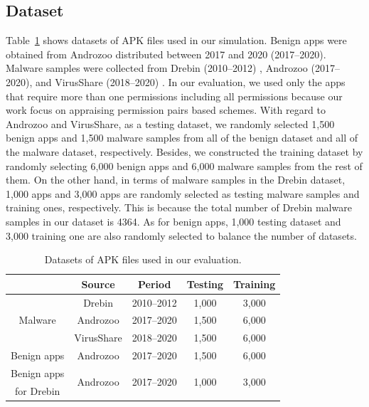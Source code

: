 \documentclass{ieeeaccess}
\newcommand{\mytablename}{Table}
\begin{document}
\subsection{Dataset}
\mytablename~\ref{tab:dataset} shows datasets of APK files used in our simulation.
Benign apps were obtained from Androzoo \cite{allix2016androzoo} distributed between 2017 and 2020 (2017--2020). 
Malware samples were collected from Drebin (2010--2012) \cite{arp2014drebin}, Androzoo (2017--2020), and VirusShare (2018--2020) \cite{virusshare}.
In our evaluation, we used only the apps that require more than one permissions including all permissions because our work focus on appraising permission pairs based schemes.
With regard to Androzoo and VirusShare, as a testing dataset, we randomly selected 1,500 benign apps and 1,500 malware samples from all of the benign dataset and all of the malware dataset, respectively.
Besides, we constructed the training dataset by randomly selecting 6,000 benign apps and 6,000 malware samples from the rest of them.
On the other hand, in terms of malware samples in the Drebin dataset, 1,000 apps and 3,000 apps are randomly selected as testing malware samples and training ones, respectively.
This is because the total number of Drebin malware samples in our dataset is 4364.
As for benign apps, 1,000 testing dataset and 3,000 training one are also randomly selected to balance the number of datasets.
\begin{table}[t]
  \begin{center}
    \caption{Datasets of APK files used in our evaluation.}
    \label{tab:dataset}
    \begin{tabular}{|c|c|c|c|c|} \hline
       & Source & Period & Testing & Training \\ \hline 
      \multirow{3}{*}{Malware} & Drebin \cite{arp2014drebin} & 2010--2012 & 1,000 & 3,000\\ \cline{2-5}
                               & Androzoo \cite{allix2016androzoo}& 2017--2020 & 1,500 & 6,000\\ \cline{2-5}
                               & VirusShare \cite{virusshare} & 2018--2020 & 1,500 & 6,000\\ \hline
      Benign apps & Androzoo \cite{allix2016androzoo}& 2017--2020 & 1,500 & 6,000  \\ \hline
      Benign apps & \multirow{2}{*}{Androzoo \cite{allix2016androzoo}} & \multirow{2}{*}{2017--2020} & \multirow{2}{*}{1,000} & \multirow{2}{*}{3,000 } \\ 
      for Drebin & & & & \\ \hline
    \end{tabular}
  \end{center}
\end{table}
\end{document}
